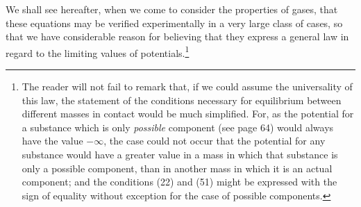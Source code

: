 \documentclass[12pt]{article}
\begin{document}
We shall see hereafter, when we come to consider the properties of gases, that these equations may be verified experimentally in a very large class of cases, so that we have considerable reason for believing that they express a general law in regard to the limiting values of potentials.\footnote{The reader will not fail to remark that, if we could assume the universality of this law, the statement of the conditions necessary for equilibrium between different masses in contact would be much simplified. For, as the potential for a substance which is only \textit{possible} component (see page 64) would always have the value $-\infty$, the case could not occur that the potential for any substance would have a greater value in a mass in which that substance is only a possible component, than in another mass in which it is an actual component; and the conditions (22) and (51) might be expressed with the sign of equality without exception for the case of possible components.}

\end{document}
